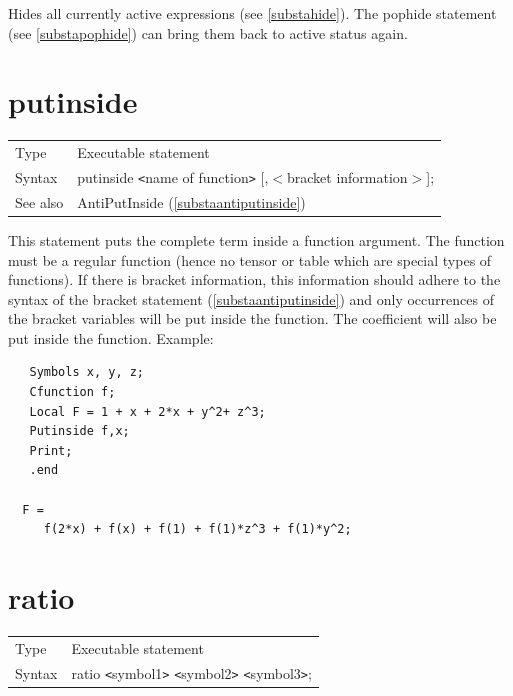 \noindent Hides all currently active 
expressions (see \ref{substahide}). The pophide statement 
(see \ref{substapophide}) can bring them back to active status again. 
\vspace{10mm}


\section{putinside}
\label{substaputinside}

\noindent \begin{tabular}{ll}
Type & Executable statement\\
Syntax & putinside {\tt<}name of function{\tt>} [,$<$bracket information$>$];
\\ See also & AntiPutInside (\ref{substaantiputinside})
\end{tabular}\vspace{4mm}

\noindent This statement puts the complete term inside a 
function argument. The function must be a regular function (hence no tensor 
or table which are special types of functions). If there is 
bracket information, this information should adhere to the 
syntax of the bracket statement (\ref{substaantiputinside}) and only 
occurrences of the bracket variables will be put inside the function. The 
coefficient will also be put inside the function. Example:
\begin{verbatim}
   Symbols x, y, z;
   Cfunction f;
   Local F = 1 + x + 2*x + y^2+ z^3;
   Putinside f,x;
   Print;
   .end

  F =
     f(2*x) + f(x) + f(1) + f(1)*z^3 + f(1)*y^2;
\end{verbatim}
\vspace{10mm}

 
\section{ratio}
\label{substaratio}

\noindent \begin{tabular}{ll}
Type & Executable statement\\
Syntax & ratio {\tt<}symbol1{\tt>} {\tt<}symbol2{\tt>} {\tt<}symbol3{\tt>};
\end{tabular} \vspace{4mm}

